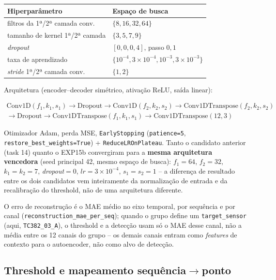 \documentclass[11pt,a4paper]{article}
\begin{document}
\begin{center}
\small
\begin{tabular}{@{}ll@{}}
\toprule
Hiperparâmetro & Espaço de busca \\
\midrule
filtros da 1ª/2ª camada conv. & $\{8, 16, 32, 64\}$ \\
tamanho de kernel 1ª/2ª camada & $\{3, 5, 7, 9\}$ \\
\emph{dropout} & $[0{,}0, 0{,}4]$, passo $0{,}1$ \\
taxa de aprendizado & $\{10^{-4}, 3{\times}10^{-4}, 10^{-3}, 3{\times}10^{-3}\}$ \\
\emph{stride} 1ª/2ª camada conv. & $\{1, 2\}$ \\
\bottomrule
\end{tabular}
\end{center}

Arquitetura (encoder--decoder simétrico, ativação ReLU, saída linear):

\begin{multline*}
\text{Conv1D}(f_1,k_1,s_1) \to \text{Dropout} \to \text{Conv1D}(f_2,k_2,s_2)
\to \text{Conv1DTranspose}(f_2,k_2,s_2) \\
\to \text{Dropout} \to
\text{Conv1DTranspose}(f_1,k_1,s_1) \to \text{Conv1DTranspose}(12,3)
\end{multline*}

Otimizador Adam, perda MSE, \texttt{EarlyStopping} (\texttt{patience=5},
\texttt{restore\_best\_weights=True}) + \texttt{ReduceLROnPlateau}.
Tanto o candidato anterior (task 14) quanto o EXP15b convergiram para a
\textbf{mesma arquitetura vencedora} (seed principal 42, mesmo espaço
de busca): $f_1{=}64$, $f_2{=}32$, $k_1{=}k_2{=}7$, \emph{dropout}$=0$,
$lr{=}3{\times}10^{-4}$, $s_1{=}s_2{=}1$ -- a diferença de resultado
entre os dois candidatos vem inteiramente da normalização de entrada e
da recalibração do threshold, não de uma arquitetura diferente.

O erro de reconstrução é o MAE médio no eixo temporal, por sequência e
por canal (\texttt{reconstruction\_mae\_per\_seq}); quando o grupo
define um \texttt{target\_sensor} (aqui, \texttt{TC382\_03\_A}), o
threshold e a detecção usam só o MAE desse canal, não a média entre os
12 canais do grupo -- os demais canais entram como \emph{features} de
contexto para o autoencoder, não como alvo de detecção.

\subsection{Threshold e mapeamento sequência$\to$ponto}
\end{document}

